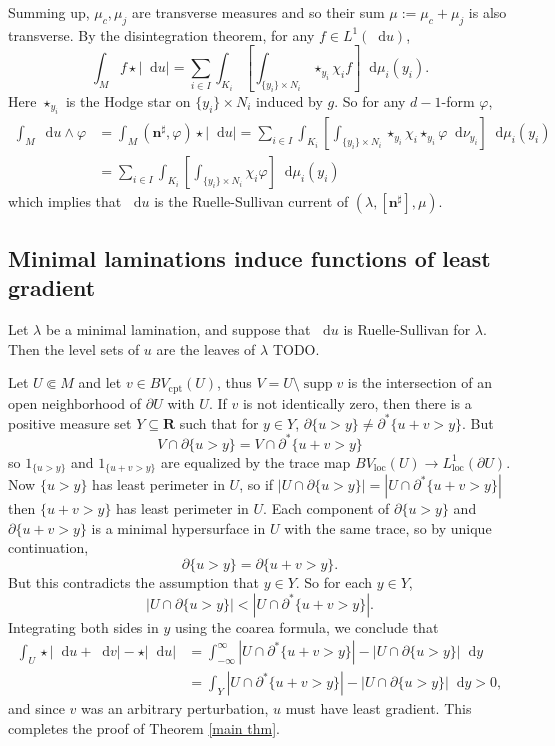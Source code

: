 \documentclass[reqno,10pt]{amsart}
\newcommand{\RR}{\mathbf{R}}
\DeclareMathOperator{\supp}{supp}
\newcommand*\dif{\mathop{}\!\mathrm{d}}
\newcommand{\normal}{\mathbf n}
\newcommand{\loc}{\mathrm{loc}}
\newcommand{\cpt}{\mathrm{cpt}}
\theoremstyle{definition}
\numberwithin{equation}{section}
\begin{document}
Summing up, $\mu_c, \mu_j$ are transverse measures and so their sum $\mu := \mu_c + \mu_j$ is also transverse.
By the disintegration theorem, for any $f \in L^1(\dif u)$,
$$\int_M f \star |\dif u| = \sum_{i \in I} \int_{K_i} \left[\int_{\{y_i\} \times N_i} \star_{y_i} \chi_i f \right] \dif \mu_i(y_i).$$
Here $\star_{y_i}$ is the Hodge star on $\{y_i\} \times N_i$ induced by $g$.
So for any $d-1$-form $\varphi$,
\begin{align*}
\int_M \dif u \wedge \varphi &= \int_M (\normal^\sharp, \varphi) \star |\dif u|
= \sum_{i \in I} \int_{K_i} \left[\int_{\{y_i\} \times N_i} \star_{y_i} \chi_i \star_{y_i} \varphi \dif \nu_{y_i}\right] \dif \mu_i(y_i) \\
&= \sum_{i \in I} \int_{K_i} \left[\int_{\{y_i\} \times N_i} \chi_i \varphi\right] \dif \mu_i(y_i)
\end{align*}
which implies that $\dif u$ is the Ruelle-Sullivan current of $(\lambda, [\normal^\sharp], \mu)$.



\subsection{Minimal laminations induce functions of least gradient}
Let $\lambda$ be a minimal lamination, and suppose that $\dif u$ is Ruelle-Sullivan for $\lambda$.
Then the level sets of $u$ are the leaves of $\lambda$ TODO.

Let $U \Subset M$ and let $v \in BV_\cpt(U)$, thus $V = U \setminus \supp v$ is the intersection of an open neighborhood of $\partial U$ with $U$.
If $v$ is not identically zero, then there is a positive measure set $Y \subseteq \RR$ such that for $y \in Y$, $\partial \{u > y\} \neq \partial^* \{u + v > y\}$.
But
$$V \cap \partial \{u > y\} = V \cap \partial^* \{u + v > y\}$$
so $1_{\{u > y\}}$ and $1_{\{u + v > y\}}$ are equalized by the trace map $BV_\loc(U) \to L^1_\loc(\partial U)$.
Now $\{u > y\}$ has least perimeter in $U$, so if $|U \cap \partial \{u > y\}| = |U \cap \partial^* \{u + v > y\}|$ then $\{u + v > y\}$ has least perimeter in $U$.
Each component of $\partial \{u > y\}$ and $\partial \{u + v > y\}$ is a minimal hypersurface in $U$ with the same trace, so by unique continuation,
$$\partial \{u > y\} = \partial \{u + v > y\}.$$
But this contradicts the assumption that $y \in Y$. So for each $y \in Y$,
$$|U \cap \partial \{u > y\}| < |U \cap \partial^* \{u + v > y\}|.$$
Integrating both sides in $y$ using the coarea formula, we conclude that
\begin{align*}
\int_U \star |\dif u + \dif v| - \star |\dif u| &= \int_{-\infty}^\infty |U \cap \partial^* \{u + v > y\}| - |U \cap \partial \{u > y\}| \dif y \\
&= \int_Y |U \cap \partial^* \{u + v > y\}| - |U \cap \partial \{u > y\}| \dif y > 0,
\end{align*}
and since $v$ was an arbitrary perturbation, $u$ must have least gradient.
This completes the proof of Theorem \ref{main thm}.


\printbibliography
\end{document}
